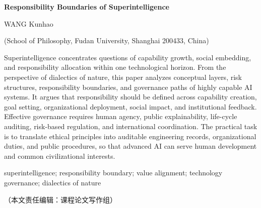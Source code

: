 \documentclass[a4paper,UTF8,zihao=5,twoside]{ctexart}
\begin{document}
\vspace{1.2em}
\begin{center}
{\bfseries Responsibility Boundaries of Superintelligence\par}
\vspace{0.6em}
{\small WANG Kunhao\par}
\vspace{0.35em}
{\small (School of Philosophy, Fudan University, Shanghai 200433, China)\par}
\end{center}

Superintelligence concentrates questions of capability growth, social embedding, and responsibility allocation within one technological horizon. From the perspective of dialectics of nature, this paper analyzes conceptual layers, risk structures, responsibility boundaries, and governance paths of highly capable AI systems. It argues that responsibility should be defined across capability creation, goal setting, organizational deployment, social impact, and institutional feedback. Effective governance requires human agency, public explainability, life-cycle auditing, risk-based regulation, and international coordination. The practical task is to translate ethical principles into auditable engineering records, organizational duties, and public procedures, so that advanced AI can serve human development and common civilizational interests.

\vspace{0.35em}
 superintelligence; responsibility boundary; value alignment; technology governance; dialectics of nature

\vspace{1.2em}
\hfill{\songti{}（本文责任编辑：课程论文写作组）}
\end{document}
